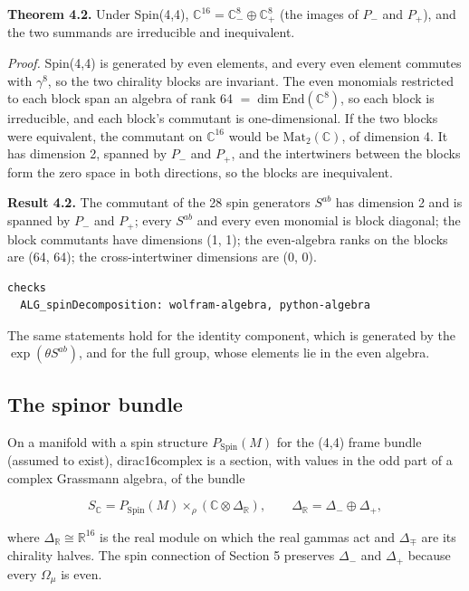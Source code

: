 \documentclass[11pt]{article}
\begin{document}
\textbf{Theorem 4.2.} Under Spin(4,4), $\mathbb C^{16}=\mathbb C^8_-\oplus\mathbb C^8_+$ (the images of $P_-$ and $P_+$), and the two summands are irreducible and inequivalent.

\emph{Proof.} Spin(4,4) is generated by even elements, and every even element commutes with $\gamma^8$, so the two chirality blocks are invariant. The even monomials restricted to each block span an algebra of rank 64 $=\dim\mathrm{End}(\mathbb C^8)$, so each block is irreducible, and each block's commutant is one-dimensional. If the two blocks were equivalent, the commutant on $\mathbb C^{16}$ would be $\mathrm{Mat}_2(\mathbb C)$, of dimension 4. It has dimension 2, spanned by $P_-$ and $P_+$, and the intertwiners between the blocks form the zero space in both directions, so the blocks are inequivalent.

\textbf{Result 4.2.} The commutant of the 28 spin generators $S^{ab}$ has dimension 2 and is spanned by $P_-$ and $P_+$; every $S^{ab}$ and every even monomial is block diagonal; the block commutants have dimensions (1, 1); the even-algebra ranks on the blocks are (64, 64); the cross-intertwiner dimensions are (0, 0).

\begin{Verbatim}[fontsize=\small]
checks
  ALG_spinDecomposition: wolfram-algebra, python-algebra
\end{Verbatim}

The same statements hold for the identity component, which is generated by the $\exp(\theta S^{ab})$, and for the full group, whose elements lie in the even algebra.

\subsection{The spinor bundle}

On a manifold with a spin structure $P_{\mathrm{Spin}}(M)$ for the (4,4) frame bundle (assumed to exist), dirac16complex is a section, with values in the odd part of a complex Grassmann algebra, of the bundle

\[
S_{\mathbb C}=P_{\mathrm{Spin}}(M)\times_\rho(\mathbb C\otimes\Delta_{\mathbb R}),\qquad \Delta_{\mathbb R}=\Delta_-\oplus\Delta_+,
\]

where $\Delta_{\mathbb R}\cong\mathbb R^{16}$ is the real module on which the real gammas act and $\Delta_\mp$ are its chirality halves. The spin connection of Section 5 preserves $\Delta_-$ and $\Delta_+$ because every $\Omega_\mu$ is even.
\end{document}
